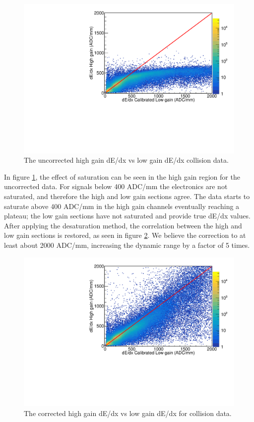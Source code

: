 \documentclass[review]{elsarticle}
\begin{document}
\begin{figure}[H]
\includegraphics[width=\linewidth]{dedxcompare_nodesat}
\caption{The uncorrected high gain dE/dx vs low gain dE/dx collision data.  }
\label{fig:lowvshigh_raw}
\end{figure}
 
In figure \ref{fig:lowvshigh_raw}, the effect of saturation can be seen in the high gain region for the uncorrected data. For signals below 400 ADC/mm the electronics are not saturated, and therefore the high and low gain sections agree. The data starts to saturate above 400 ADC/mm in the high gain channels eventually reaching a plateau; the low gain sections have not saturated and provide true dE/dx values.
 After applying the desaturation method, the correlation between the high and low gain sections is restored, as seen in figure \ref{fig:lowvshigh_desat}. We believe the correction to at least about 2000 ADC/mm, increasing the dynamic range by a factor of 5 times.

\begin{figure}[H]
\includegraphics[width=\linewidth]{dedxcompare_new}
\caption{The corrected high gain dE/dx vs low gain dE/dx for collision data.  }
\label{fig:lowvshigh_desat}
\end{figure}
\end{document}

